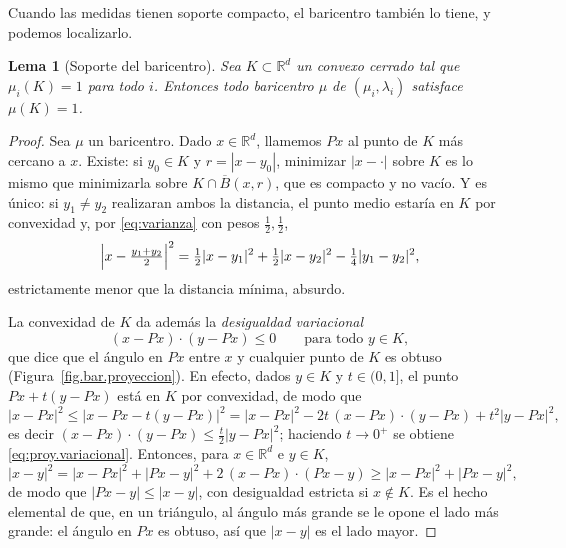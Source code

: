 \documentclass[12pt, a4paper]{amsbook}
\newcommand{\R}{{\mathbb R}}
\newtheorem{lema}[teo]{Lema}
\theoremstyle{remark}
\theoremstyle{definition}
\numberwithin{section}{chapter}
\numberwithin{subsection}{section}
\numberwithin{equation}{section}
\numberwithin{figure}{chapter}
\begin{document}
Cuando las medidas tienen soporte compacto, el baricentro también lo tiene, y
podemos localizarlo.

\begin{lema}[Soporte del baricentro]\label{lema.bar.soporte}
Sea $K\subset\R^d$ un convexo cerrado tal que $\mu_i(K)=1$ para todo $i$.
Entonces todo baricentro $\mu$ de $(\mu_i,\lambda_i)$ satisface $\mu(K)=1$.
\end{lema}

\begin{proof}
Sea $\mu$ un baricentro. Dado $x\in\R^d$, llamemos $Px$ al punto de $K$ más
cercano a $x$. Existe: si $y_0\in K$ y $r=|x-y_0|$, minimizar $|x-\cdot|$
sobre $K$ es lo mismo que minimizarla sobre $K\cap\overline B(x,r)$, que es
compacto y no vacío. Y es único: si $y_1\ne y_2$ realizaran ambos la
distancia, el punto medio estaría en $K$ por convexidad y, por
\eqref{eq:varianza} con pesos $\tfrac12,\tfrac12$,
\[
\Bigl|x-\tfrac{y_1+y_2}2\Bigr|^2
=\tfrac12|x-y_1|^2+\tfrac12|x-y_2|^2-\tfrac14|y_1-y_2|^2,
\]
estrictamente menor que la distancia mínima, absurdo.

La convexidad de $K$ da además la \emph{desigualdad variacional}
\begin{equation}\label{eq:proy.variacional}
(x-Px)\cdot(y-Px)\le0\qquad\text{para todo }y\in K,
\end{equation}
que dice que el ángulo en $Px$ entre $x$ y cualquier punto de $K$ es obtuso
(Figura~\ref{fig.bar.proyeccion}). En efecto, dados $y\in K$ y $t\in(0,1]$,
el punto $Px+t(y-Px)$ está en $K$ por convexidad, de modo que
\[
|x-Px|^2\le\bigl|x-Px-t(y-Px)\bigr|^2
=|x-Px|^2-2t\,(x-Px)\cdot(y-Px)+t^2|y-Px|^2,
\]
es decir $(x-Px)\cdot(y-Px)\le\tfrac t2|y-Px|^2$; haciendo $t\to0^+$ se
obtiene \eqref{eq:proy.variacional}. Entonces, para $x\in\R^d$ e
$y\in K$,
\[
|x-y|^2=|x-Px|^2+|Px-y|^2+2\,(x-Px)\cdot(Px-y)\ge|x-Px|^2+|Px-y|^2,
\]
de modo que $|Px-y|\le|x-y|$, con desigualdad estricta si $x\notin K$. Es el
hecho elemental de que, en un triángulo, al ángulo más grande se le opone el
lado más grande: el ángulo en $Px$ es obtuso, así que $|x-y|$ es el lado
mayor.


\end{proof}
\end{document}

